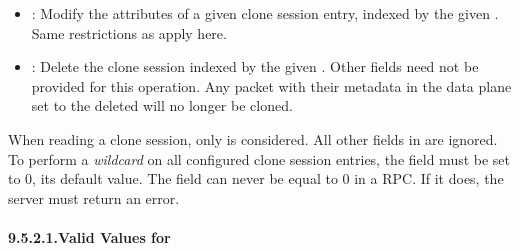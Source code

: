 \documentclass[11pt]{article}
\begin{document}
{\begin{itemize}[noitemsep,topsep=\mdcompacttopsep]
\item{}: Modify the attributes of a given clone session entry, indexed by the
given . Same restrictions as  apply here.%

\item{}: Delete the clone session indexed by the given
. Other fields need not be provided for this operation. Any
packet with their  metadata in the data plane set to the
deleted  will no longer be cloned.%
\end{itemize}%

\noindent{}When reading a clone session, only  is considered. All other fields
in  are ignored. To perform a \emph{wildcard}  on all
configured clone session entries, the  field must be set to 0, its
default value. The  field can never be equal to 0 in a 
RPC. If it does, the server must return an  error.%

\paragraph{9.5.2.1.\hspace*{0.5em}Valid Values for }\label{sec-valid-values-for-session-id}%

}
\end{document}
